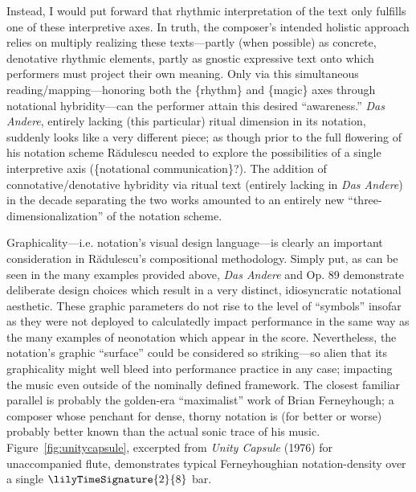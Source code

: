         Instead, I would put forward that rhythmic interpretation of the text only fulfills one of these interpretive axes. In truth, the composer's intended holistic approach relies on multiply realizing these texts---partly (when possible) as concrete, denotative rhythmic elements, partly as gnostic expressive text onto which performers must project their own meaning. Only via this simultaneous reading/mapping---honoring both the \{rhythm\} and \{magic\} axes through notational hybridity---can the performer attain this desired ``awareness.'' \textit{Das Andere}, entirely lacking (this particular) ritual dimension in its notation, suddenly looks like a very different piece; as though prior to the full flowering of his notation scheme R\u{a}dulescu needed to explore the possibilities of a single interpretive axis (\{notational communication\}?). The addition of connotative/denotative hybridity via ritual text (entirely lacking in \textit{Das Andere}) in the decade separating the two works amounted to an entirely new ``three-dimensionalization'' of the notation scheme.
        

        Graphicality---i.e. notation's visual design language---is clearly an important consideration in R\u{a}dulescu's compositional methodology. Simply put, as can be seen in the many examples provided above, \textit{Das Andere} and Op. 89 demonstrate deliberate design choices which result in a very distinct, idiosyncratic notational aesthetic. These graphic parameters do not rise to the level of ``symbols'' insofar as they were not deployed to calculatedly impact performance in the same way as the many examples of neonotation which appear in the score. Nevertheless, the notation's graphic ``surface'' could be considered so striking---so alien that its graphicality might well bleed into performance practice in any case; impacting the music even outside of the nominally defined framework. The closest familiar parallel is probably the golden-era ``maximalist'' work of Brian Ferneyhough; a composer whose penchant for dense, thorny notation is (for better or worse) probably better known than the actual sonic trace of his music. Figure~\ref{fig:unitycapsule}, excerpted from \textit{Unity Capsule} (1976) for unaccompanied flute, demonstrates typical Ferneyhoughian notation-density over a single $\lilyTimeSignature{2}{8}$ bar. 

